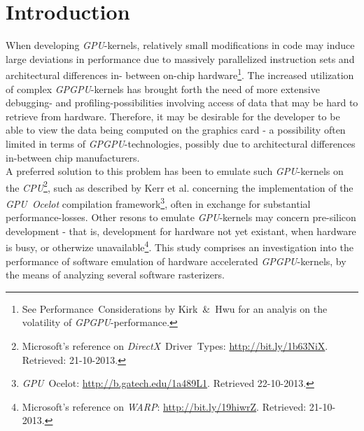 \documentclass[fleqn,10pt]{SelfArx} %
\affiliation{EricNNilsson@gmail.com}
\newlength{\tocsep}
\begin{document}
\flushbottom %
\maketitle %
\thispagestyle{empty} %

\section*{Introduction} %
\label{sec:introduction}
When developing \textit{GPU}-kernels, relatively small modifications in code may induce large deviations in performance due to massively parallelized instruction sets and architectural differences in-
between on-chip hardware\footnote{See Performance~Considerations by Kirk~\&~Hwu\cite[ch.~6]{Kirk:2010:PMP:1841511} for an analyis on the volatility of \textit{GPGPU}-performance.}. The increased utilization of complex \textit{GPGPU}-kernels has brought forth the need of more extensive debugging- and profiling-possibilities involving access of data that may be hard to retrieve from hardware. Therefore, it may be desirable for the developer to be able to view the data being computed on the graphics card - a possibility often limited in terms of \textit{GPGPU}-technologies, possibly due to architectural differences in-between chip manufacturers.\\
A preferred solution to this problem has been to emulate such \textit{GPU}-kernels on the \textit{CPU}\footnote{\label{ftn:drivertypes}Microsoft's reference on \textit{DirectX}~Driver~Types: \url{http://bit.ly/1b63NiX}. Retrieved: 21-10-2013.}, such as described by Kerr et al.\cite[p.~416-419]{Hwu:2011:GCG:2103614} concerning the implementation of the \textit{GPU~Ocelot} compilation framework\footnote{\label{ftn:ocelot}\textit{GPU}~Ocelot: \url{http://b.gatech.edu/1a489L1}. Retrieved 22-10-2013.}, often in exchange for substantial performance-losses. Other resons to emulate \textit{GPU}-kernels may concern pre-silicon development - that is, development for hardware not yet existant, when hardware is busy, or otherwize unavailable\footnote{\label{ftn:warpguide}Microsoft's reference on \textit{WARP}: \url{http://bit.ly/19hiwrZ}. Retrieved: 21-10-2013.}. This study comprises an investigation into the performance of software emulation of hardware accelerated \textit{GPGPU}-kernels, by the means of analyzing several software rasterizers.\\
\end{document}
